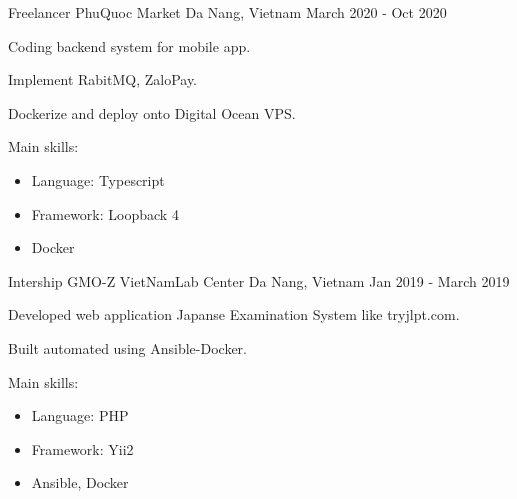 \begin{cventries}
  \cventry
    {Freelancer} %
    {PhuQuoc Market} %
    {Da Nang, Vietnam} %
    {March 2020 - Oct 2020} %
    {
      \begin{cvitems} %
        \item {Coding backend system for mobile app.}
        \item {Implement RabitMQ, ZaloPay.}
        \item {Dockerize and deploy onto Digital Ocean VPS.}
        \item {Main skills:
        	\begin{itemize}
        		\item {Language: Typescript}
  				\item {Framework: Loopback 4}
  				\item {Docker}
			\end{itemize}
        }
      \end{cvitems}
    }

  \cventry
    {Intership} %
    {GMO-Z VietNamLab Center} %
    {Da Nang, Vietnam} %
    {Jan 2019 - March 2019} %
    {
      \begin{cvitems} %
        \item {Developed web application Japanse Examination System like tryjlpt.com.}
        \item {Built automated using Ansible-Docker.}
        \item {Main skills:
        	\begin{itemize}
        		\item {Language: PHP}
  				\item {Framework: Yii2}
  				\item {Ansible, Docker}
			\end{itemize}
        }
      \end{cvitems}
    }

\end{cventries}
